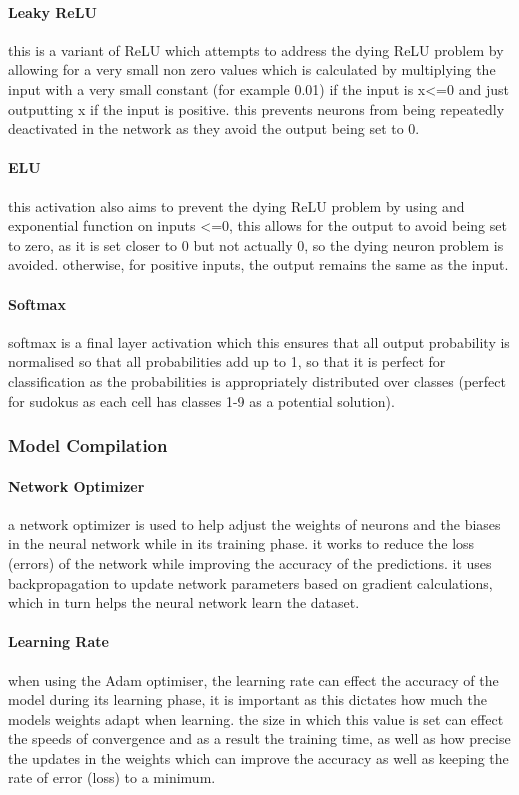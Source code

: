 \documentclass[]{final_report}
\begin{document}
\paragraph{Leaky ReLU}
this is a variant of ReLU which attempts to address the dying ReLU problem by allowing for a very small non zero values which is calculated by multiplying the input with a very small constant (for example 0.01) if the input is x<=0 and just outputting x if the input is positive. this prevents neurons from being repeatedly deactivated in the network as they avoid the output being set to 0.

\paragraph{ELU}
this activation also aims to prevent the dying ReLU problem by using and exponential function on inputs <=0, this allows for the output to avoid being set to zero, as it is set closer to 0 but not actually 0, so the dying neuron problem is avoided. otherwise, for positive inputs, the output remains the same as the input.

\paragraph{Softmax}
softmax is a final layer activation which this ensures that all output probability is normalised so that all probabilities add up to 1, so that it is perfect for classification as the probabilities is appropriately distributed over classes (perfect for sudokus as each cell has classes 1-9 as a potential solution).

\subsubsection{Model Compilation}

\paragraph{Network Optimizer}
a network optimizer is used to help adjust the weights of neurons and the biases in the neural network while in its training phase. it works to reduce the loss (errors) of the network while improving the accuracy of the predictions. it uses backpropagation to update network parameters based on gradient calculations, which in turn helps the neural network learn the dataset.

\paragraph{Learning Rate}
when using the Adam optimiser, the learning rate can effect the accuracy of the model during its learning phase, it is important as this dictates how much the models weights adapt when learning. the size in which this value is set can effect the speeds of convergence and as a result the training time, as well as how precise the updates in the weights which can improve the accuracy as well as keeping the rate of error (loss) to a minimum.
\end{document}
